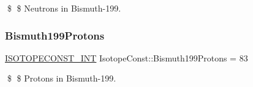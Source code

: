 \$ \$ Neutrons in Bismuth-\/199. \mbox{\label{group___isotope_const-_bismuth-_bi199_ga5321dd800b6f019127ef9cb250998f53}} 
\subsubsection{\texorpdfstring{Bismuth199\+Protons}{Bismuth199Protons}}
{\footnotesize\ttfamily \mbox{\hyperlink{group___isotope_const-_macros_ga5f18360b3e99483a35c32d789e62621c}{I\+S\+O\+T\+O\+P\+E\+C\+O\+N\+S\+T\+\_\+\+I\+NT}} Isotope\+Const\+::\+Bismuth199\+Protons = 83}

\$ \$ Protons in Bismuth-\/199. 